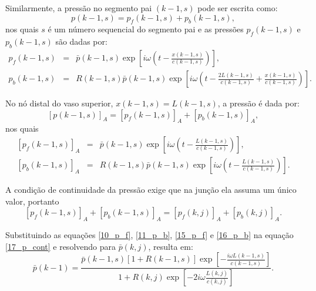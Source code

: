 \documentclass[
        english,			
        brazil			        %
        ,<...>]{abntbibufjf}
\begin{document}
Similarmente, a pressão no segmento pai $(k-1,s)$ pode ser escrita como:
\begin{equation}
p(k-1,s) =  p_f(k-1,s) + p_b (k-1,s),
\label{12_p|_f}
\end{equation}
nos quais $s$ é um número sequencial do segmento pai e as pressões $ p_f (k-1,s)$ e $p_b (k-1,s)$ são dadas por:
\begin{eqnarray}
p_f (k-1,s) &=& \bar{p}(k-1,s)\exp\left[i\omega \left(t - \frac{x(k-1,s)}{c (k-1,s)}\right) \right],\\
\label{13_p_f}
p_b (k-1,s) &=& R (k-1,s)\bar{p}(k-1,s)\exp\left[ i\omega \left( t - \frac{2L(k-1,s)}{c(k-1,s)} + \frac{x(k-1,s)}{c(k-1,s)}\right) \right]. \nonumber
\end{eqnarray}

No nó distal do vaso superior, $x(k-1,s) = L(k-1,s)$, a pressão é dada por:
\begin{equation}
\left[ p(k-1,s) \right]_A = \left[ p_f(k-1,s)\right]_A + \left[ p_b(k-1,s) \right]_A,
\label{12_p|_f}
\end{equation}
nos quais 
\begin{eqnarray}
\left[ p_f(k-1,s) \right]_A &=& \bar{p}(k-1,s)\exp\left[ i\omega \left(t - \frac{L(k-1,s)}{c(k-1,s)}\right)\right],
\label{15_p_f}
\\
\left[ p_b(k-1,s) \right]_A &=& R(k-1,s)\bar{p}(k-1,s)\exp\left[i\omega \left( t - \frac{L(k-1,s)}{c(k-1,s)} \right) \right]. 
\label{16_p_b}
\end{eqnarray}

A condição de continuidade da pressão exige que na junção ela assuma um único valor, portanto
\begin{equation}
\left[ p_f(k-1,s) \right]_A + \left[ p_b (k-1,s) \right]_A = \left[ p_f(k,j) \right]_A + \left[ p_b(k,j) \right]_A.
\label{17_p_cont}
\end{equation}

Substituindo as equações \eqref{10_p_f}, \eqref{11_p_b}, \eqref{15_p_f} e \eqref{16_p_b} na equação \eqref{17_p_cont} e resolvendo para $\bar{p}(k,j)$, resulta em:
\begin{equation}
\bar{p} (k-1) =  \frac{\bar{p}(k-1,s)\left[1 + R(k-1,s)\right] \exp\left[ -\frac{i \omega L(k-1,s)}{c(k-1,s)}\right]}{1 + R(k,j)\exp{\left[ -2i\omega \frac{L(k,j)}{c(k,j)}\right]}}.
\label{18_barp}
\end{equation}
\end{document}
